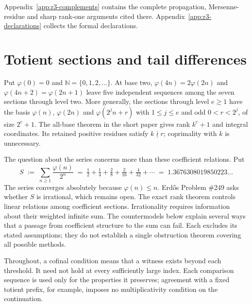 \documentclass[11pt]{article}
\theoremstyle{plain}
\theoremstyle{definition}
\theoremstyle{remark}
\newcommand{\N}{\mathbb{N}}
\begin{document}
Appendix~\ref{app:r3-complements} contains the complete propagation,
Mersenne-residue and sharp rank-one arguments cited there.
Appendix~\ref{app:r3-declarations} collects the formal declarations.

\setcounter{tocdepth}{1}
\clearpage
\tableofcontents
\clearpage
\section{Totient sections and tail differences}

Put $\varphi(0)=0$ and $\N=\{0,1,2,\ldots\}$. At base two,
$\varphi(4n)=2\varphi(2n)$ and $\varphi(4n+2)=\varphi(2n+1)$ leave five
independent sequences among the seven sections through level two.
More generally, the sections through level $e\ge1$ have the basis
$\varphi(n)$, $\varphi(2n)$ and $\varphi(2^jn+r)$ with
$1\le j\le e$ and odd $0<r<2^j$, of size $2^e+1$.
The all-base theorem in the short paper gives rank $k^e+1$ and integral
coordinates. Its retained positive residues satisfy $k\nmid r$;
coprimality with $k$ is unnecessary.

The question about the series concerns more than these coefficient
relations. Put
\[
  S \;:=\; \sum_{n \ge 1} \frac{\varphi(n)}{2^{n}}
  \;=\; \tfrac12 + \tfrac14 + \tfrac{2}{8} + \tfrac{2}{16} + \tfrac{4}{32} + \cdots
  \;=\; 1.3676308019850223\ldots
\]
The series converges absolutely because $\varphi(n) \le n$. Erd\H{o}s Problem
\#249 asks whether $S$ is irrational, which remains open. The exact rank
theorem controls linear relations among coefficient sections. Irrationality
requires information about their weighted infinite sum. The countermodels
below explain several ways that a passage from coefficient structure to the
sum can fail. Each excludes its stated assumptions; they do not establish a
single obstruction theorem covering all possible methods.

Throughout, a cofinal condition means that a witness exists beyond each
threshold. It need not hold at every sufficiently large index. Each
comparison sequence is used only for the properties it preserves;
agreement with a fixed totient prefix, for example, imposes no
multiplicativity condition on the continuation.
\end{document}
